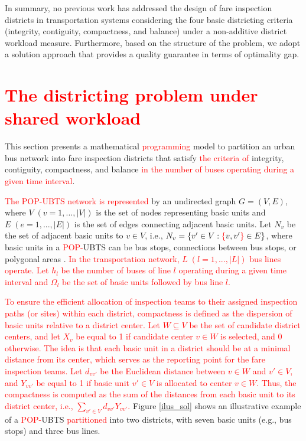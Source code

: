 \documentclass[preprint,11pt]{elsarticle}
\begin{document}
In summary, no previous work has addressed the design of fare inspection districts in transportation systems considering the four basic districting criteria (integrity, contiguity, compactness, and balance) under a non-additive district workload measure. 
Furthermore, based on the structure of the problem, we adopt a solution approach that provides a quality guarantee in terms of optimality gap.



\section{\textcolor{red}{The districting problem under shared workload}}
\label{sec:formulation}

This section presents a mathematical \textcolor{red}{programming} model to partition an urban bus network into fare inspection districts that satisfy \textcolor{red}{the criteria of} integrity, contiguity, compactness, and balance \textcolor{red}{in the number of buses operating during a given time interval}.

\textcolor{red}{The POP-UBTS network is represented} by an undirected graph $G = (V, E)$, where $V \; (v = 1, ..., |V |)$ is the set of nodes representing basic units and $E \; (e = 1, ..., |E|)$ is the set of edges connecting adjacent basic units. Let $N_{v}$ be the set of adjacent basic units to $v \in V$, i.e., $N_{v}=\{ v' \in V: \textcolor{red}{\{}v, v'\textcolor{red}{\}} \in E \}$, where basic units in a \textcolor{red}{POP-}UBTS can be bus stops, connections between bus stops, or polygonal areas \citep{Kalcsics2019}. 
\textcolor{red}{In the transportation network, $L \; (l = 1, ..., |L|)$ bus lines operate. Let $h_l$ be the number of buses of line $l$ operating during a given time interval and \textcolor{red}{$\Omega_{l}$} be the set of basic units followed by bus line $l$.}

\textcolor{red}{To ensure the efficient allocation of inspection teams to their assigned inspection paths (or sites) within each district, compactness is defined as the dispersion of basic units relative to a district center. 
Let $W \subseteq V$ be the set of candidate district centers, and let $X_v$ be equal to 1 if candidate center $v \in W$ is selected, and 0 otherwise.
The idea is that each basic unit in a district should be at a minimal distance from its center, which serves as the reporting point for the fare inspection teams.
Let $d_{vv'}$ be the Euclidean distance between $v \in W$ and $v' \in V$, and $Y_{vv'}$ be equal to 1 if basic unit $v' \in V$ is allocated to center $v \in W$. 
Thus, the compactness is computed as the sum of the distances from each basic unit to its district center, i.e., $\sum_{v' \in V} d_{v v'} Y_{v v'}$.}
Figure \ref{ilus_sol} shows an illustrative example of a \textcolor{red}{POP-}UBTS \textcolor{red}{partitioned} into two districts, with seven basic units (e.g., bus stops) and three bus lines.
\end{document}
